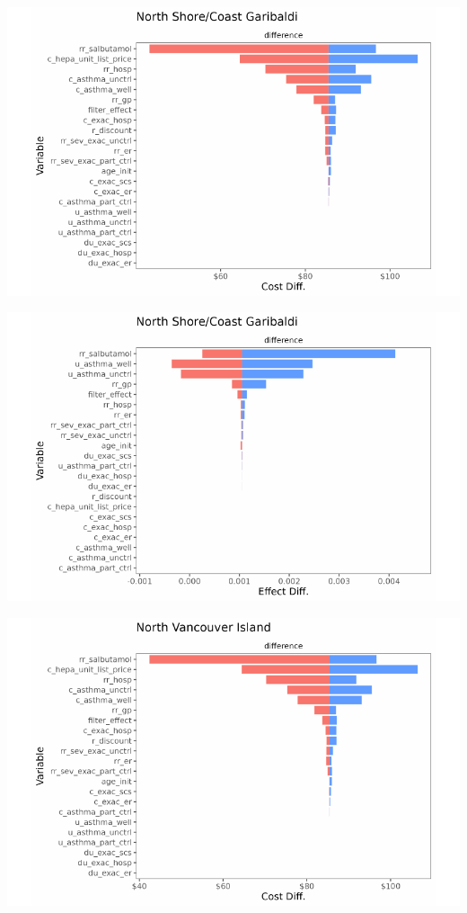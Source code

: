 \documentclass[
  number]{elsarticle}
\begin{document}
\includegraphics{index_files/figure-pdf/unnamed-chunk-9-13.pdf}

\includegraphics{index_files/figure-pdf/unnamed-chunk-9-14.pdf}

\includegraphics{index_files/figure-pdf/unnamed-chunk-9-15.pdf}
\end{document}
